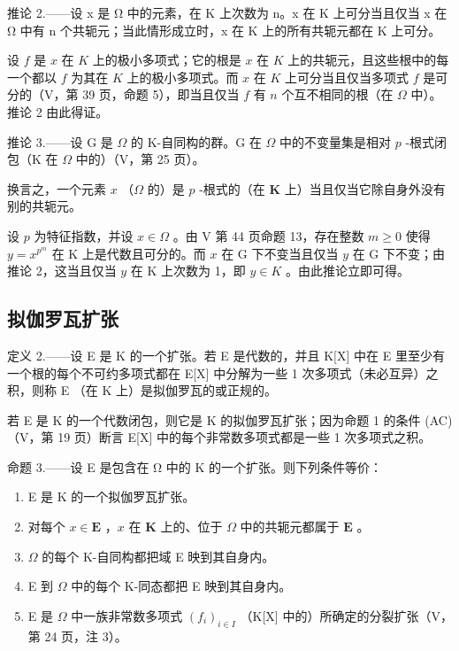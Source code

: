 推论 2.——设 x 是 Ω 中的元素，在 K 上次数为 n。x 在 K 上可分当且仅当 x 在 Ω 中有 n 个共轭元；当此情形成立时，x 在 K 上的所有共轭元都在 K 上可分。

设 \(f\) 是 \(x\) 在 \(K\) 上的极小多项式；它的根是 \(x\) 在 \(K\) 上的共轭元，且这些根中的每一个都以 \(f\) 为其在 \(K\) 上的极小多项式。而 \(x\) 在 \(K\) 上可分当且仅当多项式 \(f\) 是可分的（V，第 39 页，命题 5），即当且仅当 \(f\) 有 \(n\) 个互不相同的根（在 \(\Omega\) 中）。推论 2 由此得证。

推论 3.——设 G 是 \(\Omega\) 的 K-自同构的群。G 在 \(\Omega\) 中的不变量集是相对 \(p\) -根式闭包（K 在 \(\Omega\) 中的）（V，第 25 页）。

换言之，一个元素 \(x\) （\(\Omega\) 的）是 \(p\) -根式的（在 \(\mathbf{K}\) 上）当且仅当它除自身外没有别的共轭元。

设 \(p\) 为特征指数，并设 \(x \in \Omega\) 。由 V 第 44 页命题 13，存在整数 \(m \geqslant 0\) 使得 \(y = x^{p^m}\) 在 K 上是代数且可分的。而 \(x\) 在 G 下不变当且仅当 \(y\) 在 G 下不变；由推论 2，这当且仅当 \(y\) 在 K 上次数为 1，即 \(y \in K\) 。由此推论立即可得。

\subsection{拟伽罗瓦扩张}

定义 2.——设 E 是 K 的一个扩张。若 E 是代数的，并且 K{[}X{]} 中在 E 里至少有一个根的每个不可约多项式都在 E{[}X{]} 中分解为一些 1 次多项式（未必互异）之积，则称 E （在 K 上）是拟伽罗瓦的或正规的。

若 E 是 K 的一个代数闭包，则它是 K 的拟伽罗瓦扩张；因为命题 1 的条件 (AC)（V，第 19 页）断言 E{[}X{]} 中的每个非常数多项式都是一些 1 次多项式之积。

命题 3.——设 E 是包含在 Ω 中的 K 的一个扩张。则下列条件等价：

\begin{enumerate}
\def\labelenumi{\alph{enumi})}
\item
  E 是 K 的一个拟伽罗瓦扩张。
\item
  对每个 \(x \in \mathbf{E}\) ，\(x\) 在 \(\mathbf{K}\) 上的、位于 \(\Omega\) 中的共轭元都属于 \(\mathbf{E}\) 。
\item
  \(\Omega\) 的每个 K-自同构都把域 E 映到其自身内。
\item
  E 到 \(\Omega\) 中的每个 K-同态都把 E 映到其自身内。
\item
  E 是 \(\Omega\) 中一族非常数多项式 \((f_i)_{i\in I}\) （K{[}X{]} 中的）所确定的分裂扩张（V，第 24 页，注 3）。
\end{enumerate}

